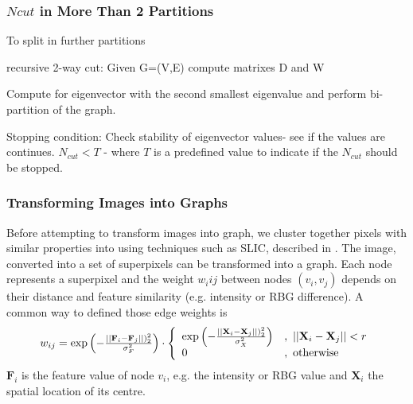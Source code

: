 \documentclass[a4paper]{article}
\begin{document}
\subsubsection{$Ncut$ in More Than 2 Partitions}
To split in further partitions

recursive 2-way cut:
Given G=(V,E)  compute matrixes D and W

Compute for eigenvector with the second smallest eigenvalue and perform bi-partition of the graph.

Stopping condition:
Check stability of eigenvector values- see if the values are continues.
$N_{cut} < T$  - where $T$ is a predefined value to indicate if the $N_{cut}$ should be stopped.






\subsubsection{Transforming Images into Graphs}

Before attempting to transform images into graph, we cluster together pixels with similar properties into  using techniques such as SLIC, described in \TODO[ref]. The image, converted into a set of superpixels can be transformed into a graph. Each node represents a superpixel and the weight $w_i{ij}$ between nodes $(v_i,v_j)$ depends on their distance and feature similarity (e.g. intensity or RBG difference). A common way to defined those edge weights is
\begin{equation}
    w_{ij}= \exp\left(-\tfrac{\left|\left|\textbf{F}_i - \textbf{F}_j \right|\right|)_2^2}{\sigma_F^2}\right) \cdot \left\{
\begin{array}{ll}
      \exp\left(-\tfrac{\left|\left|\textbf{X}_i - \textbf{X}_j \right|\right|)_2^2}{\sigma_X^2}\right) &,\ \left|\left|\textbf{X}_i - \textbf{X}_j \right|\right| < r\\ 
      0 &,\ \textup{otherwise}
\end{array} 
\right.
\end{equation}
$\textbf{F}_i$ is the feature value of node $v_i$, e.g. the intensity or RBG value and $\textbf{X}_i$ the spatial location of its centre.
\end{document}
